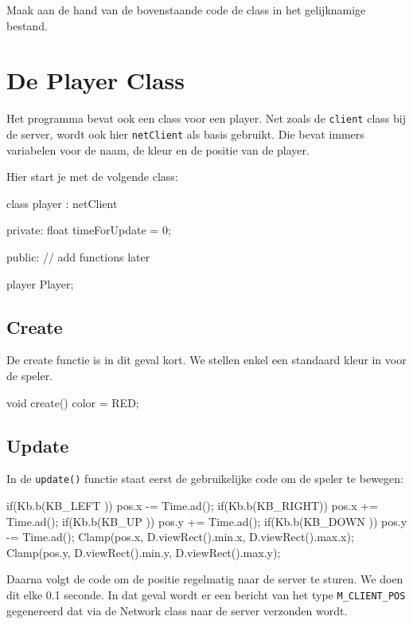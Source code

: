 \begin{exercise}
Maak aan de hand van de bovenstaande code de class  in het gelijknamige bestand.
\end{exercise}

\section{De Player Class}
Het programma bevat ook een class voor een player. Net zoals de \texttt{client} class bij de server, wordt ook hier \texttt{netClient} als basis gebruikt. Die bevat immers variabelen voor de naam, de kleur en de positie van de player.

Hier start je met de volgende class:

\begin{code}
class player : netClient {
private:
	float timeForUpdate = 0;
	
public:
  // add functions later
}
player Player;
\end{code}

\subsection{Create}
De create functie is in dit geval kort. We stellen enkel een standaard kleur in voor de speler.

\begin{code}
void create() {
  color = RED;
}
\end{code}

\subsection{Update}

In de \texttt{update()} functie staat eerst de gebruikelijke code om de speler te bewegen:

\begin{code}
if(Kb.b(KB_LEFT )) pos.x -= Time.ad();
if(Kb.b(KB_RIGHT)) pos.x += Time.ad();
if(Kb.b(KB_UP   )) pos.y += Time.ad();
if(Kb.b(KB_DOWN )) pos.y -= Time.ad();
Clamp(pos.x, D.viewRect().min.x, D.viewRect().max.x);
Clamp(pos.y, D.viewRect().min.y, D.viewRect().max.y);
\end{code}

Daarna volgt de code om de positie regelmatig naar de server te sturen. We doen dit elke 0.1 seconde. In dat geval wordt er een bericht van het type \texttt{M\_CLIENT\_POS} gegenereerd dat via de Network class naar de server verzonden wordt.

